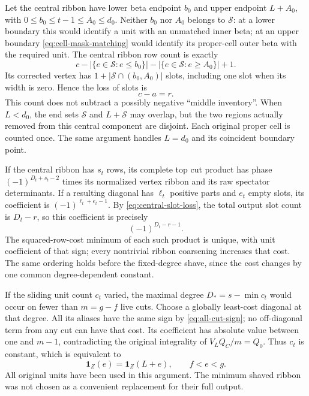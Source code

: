 \documentclass[11pt,a4paper]{amsart}
\numberwithin{equation}{section}
\theoremstyle{plain}
\theoremstyle{definition}
\newcommand{\one}{\mathbf1}
\begin{document}
Let the central ribbon have lower beta endpoint \(b_0\) and upper endpoint
\(L+A_0\), with \(0\le b_0\le t-1\le A_0\le d_0\).
Neither \(b_0\) nor \(A_0\) belongs to \(\mathcal S\): at a lower boundary this
would identify a unit with an unmatched inner beta; at an upper boundary
\eqref{eq:cell-mask-matching} would identify its proper-cell outer beta
with the required unit.  The central ribbon row count is exactly
\[
 c-|\{e\in\mathcal S:e\le b_0\}|
   -|\{e\in\mathcal S:e\ge A_0\}|+1.
\]
Its corrected vertex has
\(1+|\mathcal S\cap(b_0,A_0)|\) slots, including one slot when its width is
zero.  Hence the loss of slots is
\begin{equation}\label{eq:central-slot-loss}
 c-a=r.
\end{equation}
This count does not subtract a possibly negative ``middle inventory''.
When \(L<d_0\), the end sets \(\mathcal S\) and \(L+\mathcal S\) may overlap,
but the two regions actually removed from this central component are
disjoint.  Each original proper cell is counted once.  The same argument
handles \(L=d_0\) and its coincident boundary point.

If the central ribbon has \(s_t\) rows, its complete top cut product has
phase \((-1)^{D_t+s_t-2}\) times its normalized vertex ribbon and its raw
spectator determinants.  If a resulting diagonal has \(\ell_t\) positive
parts and \(e_t\) empty slots, its coefficient is
\((-1)^{\ell_t+e_t-1}\).  By \eqref{eq:central-slot-loss}, the total output
slot count is \(D_t-r\), so this coefficient is precisely
\begin{equation}\label{eq:all-cut-sign}
 (-1)^{D_t-r-1}.
\end{equation}
The squared-row-cost minimum of each such product is unique, with unit
coefficient of that sign; every nontrivial ribbon coarsening increases
that cost.  The same ordering holds before the fixed-degree shave, since
the cost changes by one common degree-dependent constant.

If the sliding unit count \(c_t\) varied, the maximal degree
\(D_* =s-\min c_t\) would occur on fewer than \(m=g-f\) live cuts.
Choose a globally least-cost diagonal at that degree.  All its aliases
have the same sign by \eqref{eq:all-cut-sign}; no off-diagonal term from
any cut can have that cost.  Its coefficient has absolute value between
one and \(m-1\), contradicting the original integrality of
\(V_LQ_C/m=Q_0\).  Thus \(c_t\) is constant, which is equivalent to
\begin{equation}\label{eq:physical-unit-transport}
 \one_Z(e)=\one_Z(L+e),\qquad f<e<g.
\end{equation}
All original units have been used in this argument.  The minimum shaved
ribbon was not chosen as a convenient replacement for their full output.
\end{document}
